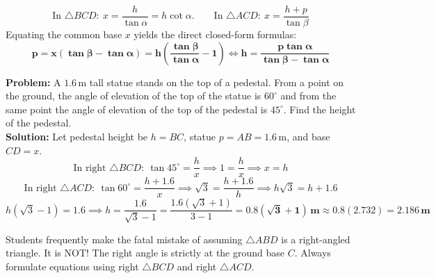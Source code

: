 \documentclass[10pt,a4paper]{article}
\begin{document}
\vspace{0.8mm}
\begin{formulaBox}[title=Master Governing Formulas for Pedestal \& Statue,fonttitle=\bfseries\color{navy}]
  $$\text{In }\triangle BCD:\ x = \frac{h}{\tan\alpha} = h\cot\alpha. \qquad \text{In }\triangle ACD:\ x = \frac{h + p}{\tan\beta}$$
  Equating the common base $x$ yields the direct closed-form formulas:
  $$\mathbf{p = x(\tan\beta - \tan\alpha) = h\left(\frac{\tan\beta}{\tan\alpha} - 1\right) \iff h = \frac{p\tan\alpha}{\tan\beta - \tan\alpha}}$$
\end{formulaBox}

\vspace{0.5mm}
\begin{conceptBox}[title=Worked Board Archetype: Statue of Height 1.6m on Pedestal,fonttitle=\bfseries\color{navy}]
  \textbf{Problem:} A $1.6\,\text{m}$ tall statue stands on the top of a pedestal. From a point on the ground, the angle of elevation of the top of the statue is $60^\circ$ and from the same point the angle of elevation of the top of the pedestal is $45^\circ$. Find the height of the pedestal. \\
  \textbf{Solution:} Let pedestal height be $h = BC$, statue $p = AB = 1.6\,\text{m}$, and base $CD = x$.
  $$\text{In right }\triangle BCD:\ \tan 45^\circ = \frac{h}{x} \implies 1 = \frac{h}{x} \implies x = h$$
  $$\text{In right }\triangle ACD:\ \tan 60^\circ = \frac{h + 1.6}{x} \implies \sqrt{3} = \frac{h + 1.6}{h} \implies h\sqrt{3} = h + 1.6$$
  $$h(\sqrt{3} - 1) = 1.6 \implies h = \frac{1.6}{\sqrt{3} - 1} = \frac{1.6(\sqrt{3} + 1)}{3 - 1} = \mathbf{0.8(\sqrt{3} + 1)\,\text{m}} \approx 0.8(2.732) = \mathbf{2.186\,\text{m}}$$
\end{conceptBox}

\vspace{0.8mm}
\begin{warningBox}[title=Common Board Exam Pitfall on Pedestals,fonttitle=\bfseries\color{navy}]
  Students frequently make the fatal mistake of assuming $\triangle ABD$ is a right-angled triangle. It is NOT! The right angle is strictly at the ground base $C$. Always formulate equations using right $\triangle BCD$ and right $\triangle ACD$.
\end{warningBox}

\newpage

\thispagestyle{fancy}
\vspace*{0mm}
\end{document}
